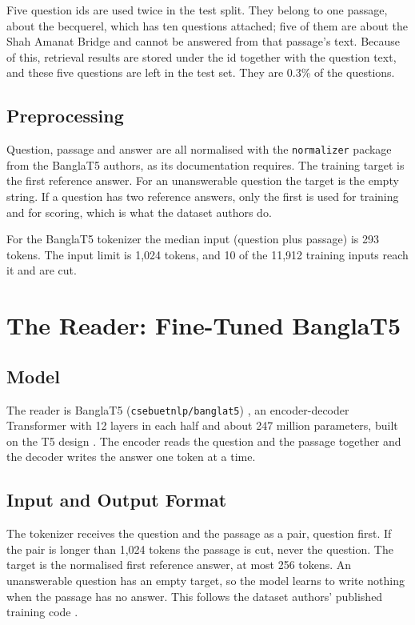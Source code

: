 Five question ids are used twice in the test split. They belong to one passage, about the becquerel, which has ten questions attached; five of them are about the Shah Amanat Bridge and cannot be answered from that passage's text. Because of this, retrieval results are stored under the id together with the question text, and these five questions are left in the test set. They are 0.3\% of the questions.

\subsection{Preprocessing}

Question, passage and answer are all normalised with the \texttt{normalizer} package from the BanglaT5 authors, as its documentation requires. The training target is the first reference answer. For an unanswerable question the target is the empty string. If a question has two reference answers, only the first is used for training and for scoring, which is what the dataset authors do.

For the BanglaT5 tokenizer the median input (question plus passage) is 293 tokens. The input limit is 1,024 tokens, and 10 of the 11,912 training inputs reach it and are cut.

\section{The Reader: Fine-Tuned BanglaT5}

\subsection{Model}

The reader is BanglaT5 (\texttt{csebuetnlp/banglat5}) \cite{bhattacharjee2023banglat5}, an encoder-decoder Transformer with 12 layers in each half and about 247 million parameters, built on the T5 design \cite{raffel2020t5}. The encoder reads the question and the passage together and the decoder writes the answer one token at a time.

\subsection{Input and Output Format}

The tokenizer receives the question and the passage as a pair, question first. If the pair is longer than 1,024 tokens the passage is cut, never the question. The target is the normalised first reference answer, at most 256 tokens. An unanswerable question has an empty target, so the model learns to write nothing when the passage has no answer. This follows the dataset authors' published training code \cite{ekram2022banglarqa}.


